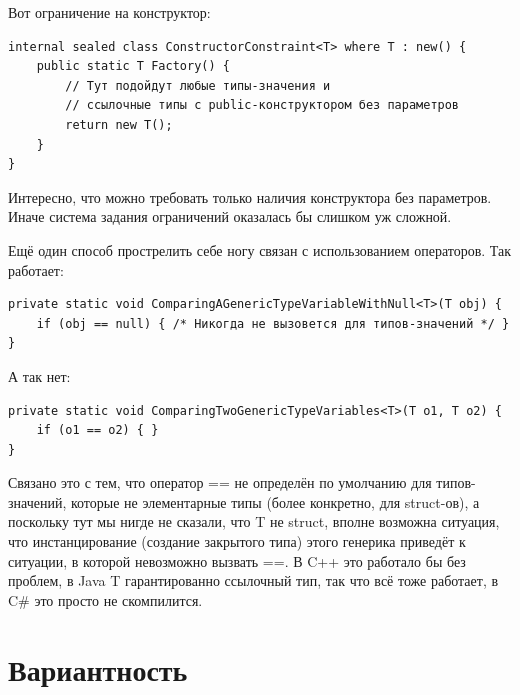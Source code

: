 \documentclass[a5paper]{article}
\begin{document}
Вот ограничение на конструктор:

\begin{verbatim}
internal sealed class ConstructorConstraint<T> where T : new() {
    public static T Factory() {
        // Тут подойдут любые типы-значения и 
        // ссылочные типы с public-конструктором без параметров
        return new T();
    }
}
\end{verbatim}

Интересно, что можно требовать только наличия конструктора без параметров. Иначе система задания ограничений оказалась бы слишком уж сложной.

Ещё один способ прострелить себе ногу связан с использованием операторов. Так работает:

\begin{verbatim}
private static void ComparingAGenericTypeVariableWithNull<T>(T obj) {
    if (obj == null) { /* Никогда не вызовется для типов-значений */ }
}
\end{verbatim}

А так нет:

\begin{verbatim}
private static void ComparingTwoGenericTypeVariables<T>(T o1, T o2) {
    if (o1 == o2) { }
}
\end{verbatim}

Связано это с тем, что оператор == не определён по умолчанию для типов-значений, которые не элементарные типы (более конкретно, для struct-ов), а поскольку тут мы нигде не сказали, что T не struct, вполне возможна ситуация, что инстанцирование (создание закрытого типа) этого генерика приведёт к ситуации, в которой невозможно вызвать ==. В C++ это работало бы без проблем, в Java T гарантированно ссылочный тип, так что всё тоже работает, в C\# это просто не скомпилится.

\section{Вариантность}
\end{document}
